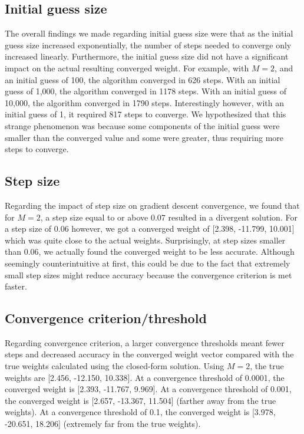 \documentclass{article}
\begin{document}
\subsection{Initial guess size}
The overall findings we made regarding initial guess size were that as the initial guess size increased exponentially, the number of steps needed to converge only increased linearly. Furthermore, the initial guess size did not have a significant impact on the actual resulting converged weight. For example, with $M = 2$, and an initial guess of 100, the algorithm converged in 626 steps. With an initial guess of 1,000, the algorithm converged in 1178 steps. With an initial guess of 10,000, the algorithm converged in 1790 steps. Interestingly however, with an initial guess of 1, it required 817 steps to converge. We hypothesized that this strange phenomenon was because some components of the initial guess were smaller than the converged value and some were greater, thus requiring more steps to converge.

\subsection{Step size}
Regarding the impact of step size on gradient descent convergence, we found that for $M =2$, a step size equal to or above $0.07$ resulted in a divergent solution. For a step size of $0.06$ however, we got a converged weight of [2.398, -11.799, 10.001] which was quite close to the actual weights. Surprisingly, at step sizes smaller than $0.06$, we actually found the converged weight to be less accurate. Although seemingly counterintuitive at first, this could be due to the fact that extremely small step sizes might reduce accuracy because the convergence criterion is met faster.

\subsection{Convergence criterion/threshold}
Regarding convergence criterion, a larger convergence thresholds meant fewer steps and decreased accuracy in the converged weight vector compared with the true weights calculated using the closed-form solution. Using $M = 2$, the true weights are [2.456, -12.150, 10.338]. At a convergence threshold of 0.0001, the converged weight is [2.393, -11.767, 9.969]. At a convergence threshold of 0.001, the converged weight is [2.657, -13.367, 11.504] (farther away from the true weights). At a convergence threshold of 0.1, the converged weight is [3.978, -20.651, 18.206] (extremely far from the true weights).
\end{document}
